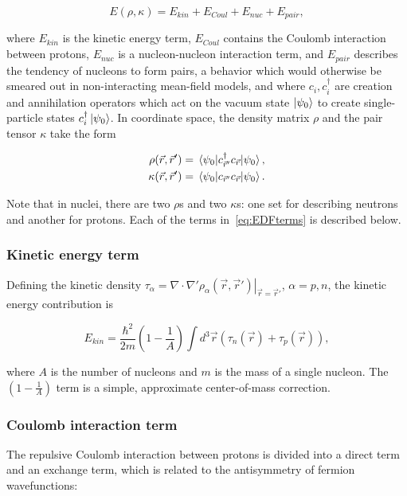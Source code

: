 \begin{equation}\label{eq:EDFterms}
E(\rho, \kappa) = E_{kin} + E_{Coul} + E_{nuc} + E_{pair},
\end{equation}

\noindent where $E_{kin}$ is the kinetic energy term, $E_{Coul}$ contains the Coulomb interaction between protons, $E_{nuc}$ is a nucleon-nucleon interaction term, and $E_{pair}$ describes the tendency of nucleons to form pairs, a behavior which would otherwise be smeared out in non-interacting mean-field models, and where $c_i, c_i^\dagger$ are creation and annihilation operators which act on the vacuum state $\ket{\psi_0}$ to create single-particle states $c_i^\dagger\ket{\psi_0}$. In coordinate space, the density matrix $\rho$ and the pair tensor $\kappa$ take the form

\begin{align}
\rho(\vec{r},\vec{r}') &= \expval{c_{\vec{r}'}^\dagger c_{\vec{r}}}{\psi_0}, \\
\kappa(\vec{r},\vec{r}') &= \expval{c_{\vec{r}'} c_{\vec{r}}}{\psi_0}.
\end{align}

\noindent Note that in nuclei, there are two $\rho$s and two $\kappa$s: one set for describing neutrons and another for protons. Each of the terms in~\eqref{eq:EDFterms} is described below.

\subsubsection{Kinetic energy term}

Defining the kinetic density $\tau_\alpha = \left.\nabla\cdot\nabla'\rho_\alpha(\vec{r},\vec{r}')\right|_{\vec{r}=\vec{r}'}$, $\alpha=p,n$, the kinetic energy contribution is

\begin{equation}
E_{kin} = \frac{\hbar^2}{2m} \left(1-\frac{1}{A}\right) \int d^3\vec{r} \left(\tau_n(\vec{r}) + \tau_p(\vec{r}) \right),
\end{equation}

\noindent where $A$ is the number of nucleons and $m$ is the mass of a single nucleon. The $\left(1-\frac{1}{A}\right)$ term is a simple, approximate center-of-mass correction.

\subsubsection{Coulomb interaction term}
The repulsive Coulomb interaction between protons is divided into a direct term and an exchange term, which is related to the antisymmetry of fermion wavefunctions:

